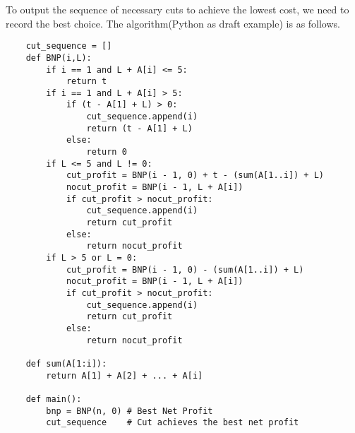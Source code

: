 \documentclass[12pt,a4paper]{article}
\newcommand{\question}[1]{\bigskip\noindent{\textbf{Q{#1} solution}}}
\begin{document}
\question{18.C}

To output the sequence of necessary cuts to achieve the lowest cost, we need to record the best choice. The algorithm(Python as draft example) is as follows.

\begin{lstlisting}
	cut_sequence = []
	def BNP(i,L):
		if i == 1 and L + A[i] <= 5:
			return t
		if i == 1 and L + A[i] > 5:
			if (t - A[1] + L) > 0:
				cut_sequence.append(i)
				return (t - A[1] + L)
			else:
				return 0
		if L <= 5 and L != 0:
			cut_profit = BNP(i - 1, 0) + t - (sum(A[1..i]) + L)
			nocut_profit = BNP(i - 1, L + A[i])
			if cut_profit > nocut_profit:
				cut_sequence.append(i)
				return cut_profit
			else:
				return nocut_profit
		if L > 5 or L = 0:
			cut_profit = BNP(i - 1, 0) - (sum(A[1..i]) + L)
			nocut_profit = BNP(i - 1, L + A[i])
			if cut_profit > nocut_profit:
				cut_sequence.append(i)
				return cut_profit
			else:
				return nocut_profit
	
	def sum(A[1:i]):
		return A[1] + A[2] + ... + A[i]

	def main():
		bnp = BNP(n, 0) # Best Net Profit
		cut_sequence 	# Cut achieves the best net profit
\end{lstlisting}
\end{document}
